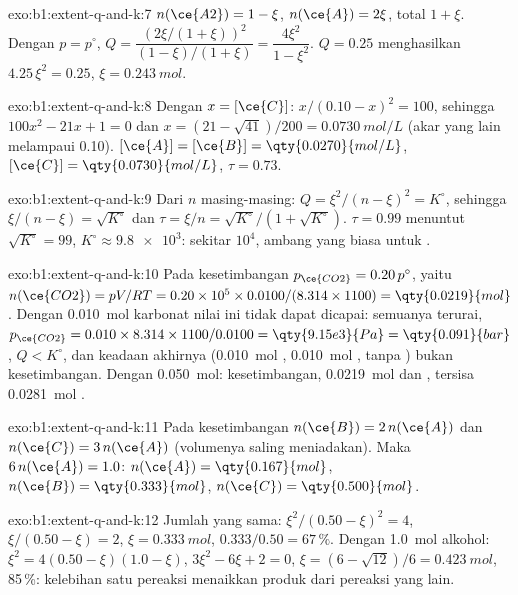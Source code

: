 \begin{solution}{exo:b1:extent-q-and-k:7}
$n(\ce{A2}) = 1 - \xi$, $n(\ce{A}) = 2\xi$, total $1 + \xi$. Dengan $p =
p^\circ$, $Q = \dfrac{(2\xi/(1+\xi))^2}{(1-\xi)/(1+\xi)} = \dfrac{4\xi^2}{1 -
\xi^2}$. $Q = 0.25$ menghasilkan $4.25\,\xi^2 = 0.25$, $\xi = \qty{0.243}{mol}$.
\end{solution}

\begin{solution}{exo:b1:extent-q-and-k:8}
Dengan $x = [\ce{C}]$: $x/(0.10 - x)^2 = 100$, sehingga $100x^2 - 21x + 1 = 0$ dan
$x = (21 - \sqrt{41})/200 = \qty{0.0730}{mol/L}$ (akar yang lain melampaui
0.10). $[\ce{A}] = [\ce{B}] = \qty{0.0270}{mol/L}$, $[\ce{C}] =
\qty{0.0730}{mol/L}$, $\tau = 0.73$.
\end{solution}

\begin{solution}{exo:b1:extent-q-and-k:9}
Dari $n$ masing-masing: $Q = \xi^2/(n - \xi)^2 = K^\circ$, sehingga $\xi/(n - \xi) =
\sqrt{K^\circ}$ dan $\tau = \xi/n = \sqrt{K^\circ}/(1 + \sqrt{K^\circ})$.
$\tau = 0.99$ menuntut $\sqrt{K^\circ} = 99$, $K^\circ \approx \num{9.8e3}$:
sekitar $10^4$, ambang yang biasa untuk .
\end{solution}

\begin{solution}{exo:b1:extent-q-and-k:10}
Pada kesetimbangan $p_{\ce{CO2}} = 0.20\,p^\circ$, yaitu $n(\ce{CO2}) =
pV/RT = 0.20 \times 10^5 \times 0.0100/(8.314 \times 1100) =
\qty{0.0219}{mol}$. Dengan \qty{0.010}{mol} karbonat nilai ini tidak dapat
dicapai: semuanya terurai, $p_{\ce{CO2}} = 0.010 \times 8.314 \times
1100/0.0100 = \qty{9.15e3}{Pa} = \qty{0.091}{bar}$, $Q < K^\circ$, dan
keadaan akhirnya (\qty{0.010}{mol} , \qty{0.010}{mol} ,
tanpa ) bukan kesetimbangan. Dengan \qty{0.050}{mol}:
kesetimbangan, \qty{0.0219}{mol}  dan , tersisa
\qty{0.0281}{mol} .
\end{solution}

\begin{solution}{exo:b1:extent-q-and-k:11}
Pada kesetimbangan $n(\ce{B}) = 2\,n(\ce{A})$ dan $n(\ce{C}) = 3\,n(\ce{A})$
(volumenya saling meniadakan). Maka $6\,n(\ce{A}) = 1.0$: $n(\ce{A}) =
\qty{0.167}{mol}$, $n(\ce{B}) = \qty{0.333}{mol}$, $n(\ce{C}) =
\qty{0.500}{mol}$.
\end{solution}

\begin{solution}{exo:b1:extent-q-and-k:12}
Jumlah yang sama: $\xi^2/(0.50 - \xi)^2 = 4$, $\xi/(0.50 - \xi) = 2$,
$\xi = \qty{0.333}{mol}$,  $0.333/0.50 = 67\,\%$. Dengan
\qty{1.0}{mol} alkohol: $\xi^2 = 4(0.50 - \xi)(1.0 - \xi)$, $3\xi^2 - 6\xi + 2 = 0$,
$\xi = (6 - \sqrt{12})/6 = \qty{0.423}{mol}$,  85\,\%: kelebihan
satu pereaksi menaikkan  produk dari pereaksi yang lain.
\end{solution}

